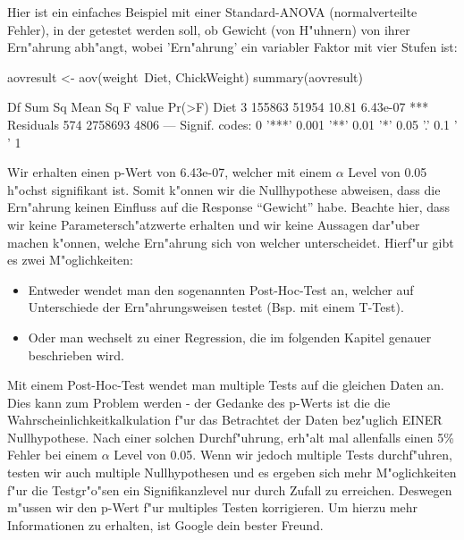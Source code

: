 \documentclass[a4paper,twoside]{tufte-book}\usepackage[]{graphicx}\usepackage[]{color}
\begin{document}
Hier ist ein einfaches Beispiel mit einer Standard-ANOVA (normalverteilte Fehler), in der getestet werden soll, ob Gewicht (von H"uhnern) von ihrer Ern"ahrung abh"angt, wobei 'Ern"ahrung' ein variabler Faktor mit vier Stufen ist:

\begin{Schunk}
\begin{Sinput}
aovresult <- aov(weight~Diet, ChickWeight)
summary(aovresult)
\end{Sinput}
\begin{Soutput}
             Df  Sum Sq Mean Sq F value   Pr(>F)    
Diet          3  155863   51954   10.81 6.43e-07 ***
Residuals   574 2758693    4806                     
---
Signif. codes:  0 '***' 0.001 '**' 0.01 '*' 0.05 '.' 0.1 ' ' 1
\end{Soutput}
\end{Schunk}

Wir erhalten einen p-Wert von 6.43e-07, welcher mit einem $\alpha$ Level von 0.05 h"ochst signifikant ist. Somit k"onnen wir die Nullhypothese abweisen, dass die Ern"ahrung keinen Einfluss auf die Response "`Gewicht"' habe. Beachte hier, dass wir keine Parametersch"atzwerte erhalten und wir keine Aussagen dar"uber machen k"onnen, welche Ern"ahrung sich von welcher unterscheidet. Hierf"ur gibt es zwei M"oglichkeiten:

\begin{itemize}
\item Entweder wendet man den sogenannten Post-Hoc-Test an, welcher auf Unterschiede der Ern"ahrungsweisen testet (Bsp. mit einem T-Test).
\item Oder man wechselt zu einer Regression, die im folgenden Kapitel genauer beschrieben wird.
\end{itemize}

Mit einem Post-Hoc-Test wendet man multiple Tests auf die gleichen Daten an. Dies kann zum Problem werden - der Gedanke des p-Werts ist die die Wahrscheinlichkeitkalkulation f"ur das Betrachtet der Daten bez"uglich EINER Nullhypothese. Nach einer solchen Durchf"uhrung, erh"alt mal allenfalls einen  5\% Fehler bei einem $\alpha$ Level von 0.05.  Wenn wir jedoch multiple Tests durchf"uhren, testen wir auch multiple Nullhypothesen und es ergeben sich mehr M"oglichkeiten f"ur die Testgr"o"sen ein Signifikanzlevel nur durch Zufall zu erreichen. Deswegen m"ussen wir den p-Wert f"ur multiples Testen korrigieren. Um hierzu mehr Informationen zu erhalten, ist Google dein bester Freund. 
\end{document}
